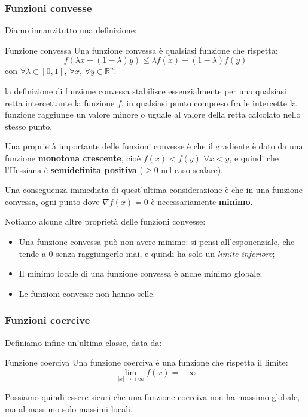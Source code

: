 \documentclass[a4paper,11pt]{article}
\begin{document}
\subsubsection{Funzioni convesse}
Diamo innanzitutto una definizione:
\begin{definition}{Funzione convessa}
	Una funzione convessa è qualsiasi funzione che rispetta:
	$$
		f(\lambda x + (1 - \lambda) y) \leq \lambda f(x) + (1 - \lambda) f(y)
	$$
	con $\forall \lambda \in [0, 1]$, $\forall x$, $\forall y \in \mathbb{R}^n$.
\end{definition}
la definizione di funzione convessa stabilisce essenzialmente per una qualsiasi retta intercettante la funzione $f$, in qualsiasi punto compreso fra le intercette la funzione raggiunge un valore minore o uguale al valore della retta calcolato nello stesso punto.

Una proprietà importante delle funzioni convesse è che il gradiente è dato da una funzione \textbf{monotona crescente}, cioè $f(x) < f(y)$ $\forall x < y$, e quindi che l'Hessiana è \textbf{semidefinita positiva} ($\geq 0$ nel caso scalare).

Una conseguenza immediata di quest'ultima considerazione è che in una funzione convessa, ogni punto dove $\nabla f(x) = 0$ è necessariamente \textbf{minimo}.

Notiamo alcune altre proprietà delle funzioni convesse:
\begin{itemize}
	\item Una funzione convessa può non avere minimo: si pensi all'esponenziale, che tende a 0 senza raggiungerlo mai, e quindi ha solo un \textit{limite inferiore};
	\item Il minimo locale di una funzione convessa è anche minimo globale;
	\item Le funzioni convesse non hanno selle.
\end{itemize}

\subsubsection{Funzioni coercive}
Definiamo infine un'ultima classe, data da:
\begin{definition}{Funzione coerciva}
	Una funzione coerciva è una funzione che rispetta il limite:
	$$
		\lim_{|x| \rightarrow +\infty} f(x) = +\infty
	$$
\end{definition}
	
Possiamo quindi essere sicuri che una funzione coerciva non ha massimo globale, ma al massimo solo massimi locali.
\end{document}

